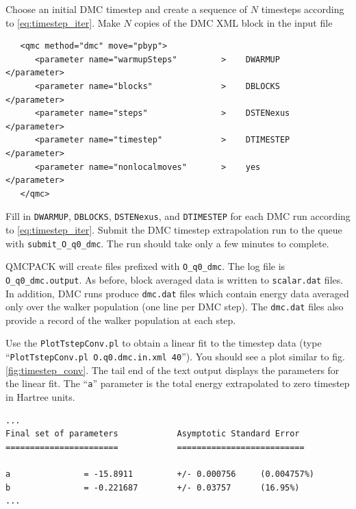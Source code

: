 Choose an initial DMC timestep and create a sequence of $N$ timesteps according to \ref{eq:timestep_iter}.  Make $N$ copies of the DMC XML block in the input file
\begin{shaded}
\begin{verbatim}
   <qmc method="dmc" move="pbyp">
      <parameter name="warmupSteps"         >    DWARMUP         </parameter>
      <parameter name="blocks"              >    DBLOCKS         </parameter>
      <parameter name="steps"               >    DSTENexus          </parameter>
      <parameter name="timestep"            >    DTIMESTEP       </parameter>
      <parameter name="nonlocalmoves"       >    yes             </parameter>
   </qmc>
\end{verbatim}
\end{shaded}
\noindent
Fill in \texttt{DWARMUP}, \texttt{DBLOCKS}, \texttt{DSTENexus}, and \texttt{DTIMESTEP} for each DMC run according to \ref{eq:timestep_iter}.  Submit the DMC timestep extrapolation run to the queue with \texttt{submit\_O\_q0\_dmc}.  The run should take only a few minutes to complete.

QMCPACK will create files prefixed with \texttt{O\_q0\_dmc}.  The log file is \texttt{O\_q0\_dmc.output}.  As before, block averaged data is written to \texttt{scalar.dat} files.  In addition, DMC runs produce \texttt{dmc.dat} files which contain energy data averaged only over the walker population (one line per DMC step).  The \texttt{dmc.dat} files also provide a record of the walker population at each step.

Use the \texttt{PlotTstepConv.pl} to obtain a linear fit to the timestep data (type ``\texttt{PlotTstepConv.pl O.q0.dmc.in.xml 40}'').  You should see a plot similar to fig. \ref{fig:timestep_conv}.  The tail end of the text output displays the parameters for the linear fit.  The ``\texttt{a}'' parameter is the total energy extrapolated to zero timestep in Hartree units. 

\begin{shaded}
\begin{verbatim}
...
Final set of parameters            Asymptotic Standard Error
=======================            ==========================

a               = -15.8911         +/- 0.000756     (0.004757%)
b               = -0.221687        +/- 0.03757      (16.95%)
...
\end{verbatim}
\end{shaded}

